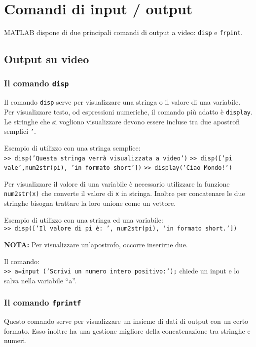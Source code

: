 \chapter{Comandi di input / output}
MATLAB dispone di due principali comandi di output a video: \texttt{disp} e \texttt{frpint}.
\section{Output su video}
\subsection{Il comando \texttt{disp}}
Il comando \texttt{disp} serve per visualizzare una stringa o il valore di una variabile. \\
Per visualizzare testo, od espressioni numeriche, il comando più adatto è \texttt{display}. \\
Le stringhe che si vogliono visualizzare devono essere incluse tra due apostrofi semplici \texttt{'}.
\break
			
Esempio di utilizzo con una stringa semplice: \\
\texttt{>> disp('Questa stringa verrà visualizzata a video')} 
\break
\texttt{>> disp(['pi vale',num2str(pi), 'in formato short'])} 
\break	
\texttt{>> display('Ciao Mondo!')} 
\break		

Per visualizzare il valore di una variabile è necessario utilizzare la funzione \texttt{num2str(x)} che converte il 
valore di \texttt{x} in stringa. Inoltre per concatenare le due stringhe bisogna trattare la loro unione come un 
vettore. 
\break
			
Esempio di utilizzo con una stringa ed una variabile: \\

\texttt{>> disp(['Il valore di pi è: ', num2str(pi), 'in formato short.'])}
\break

\textbf{NOTA:} Per visualizzare un'apostrofo, occorre inserirne due.

Il comando: \\

\texttt{>> a=input (’Scrivi un numero intero positivo:’);} chiede un input e lo salva nella variabile ``a''. 

\subsection{Il comando \texttt{fprintf}}
Questo comando serve per visualizzare un insieme di dati di output con un certo formato. Esso inoltre ha una gestione 
migliore della concatenazione tra stringhe e numeri.
\break
			
